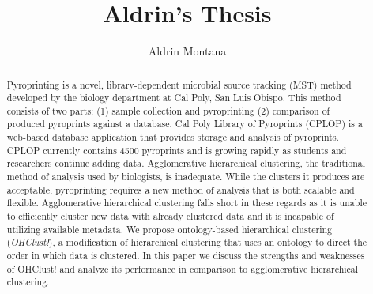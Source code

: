 \documentclass[12pt]{ucthesis}
\begin{document}
\title{Aldrin's Thesis}
\author{Aldrin Montana}



\maketitle
\begin{frontmatter}
   \copyrightpage

   \committeemembershippage

   \begin{abstract}
      Pyroprinting is a novel, library-dependent microbial source tracking
      (MST) method developed by the biology department at Cal Poly, San Luis
      Obispo. This method consists of two parts: (1) sample collection and
      pyroprinting (2) comparison of produced pyroprints against a database.
      Cal Poly Library of Pyroprints (CPLOP) is a web-based database
      application that provides storage and analysis of pyroprints. CPLOP
      currently contains 4500 pyroprints and is growing rapidly as students and
      researchers continue adding data. Agglomerative hierarchical clustering,
      the traditional method of analysis used by biologists, is inadequate.
      While the clusters it produces are acceptable, pyroprinting requires a
      new method of analysis that is both scalable and flexible. Agglomerative
      hierarchical clustering falls short in these regards as it is unable to
      efficiently cluster new data with already clustered data and it is
      incapable of utilizing available metadata. We propose ontology-based
      hierarchical clustering (\textit{OHClust!}), a modification of
      hierarchical clustering that uses an ontology to direct the order in
      which data is clustered. In this paper we discuss the strengths and
      weaknesses of OHClust! and analyze its performance in comparison to
      agglomerative hierarchical clustering.
   \end{abstract}


\end{frontmatter}
\end{document}
